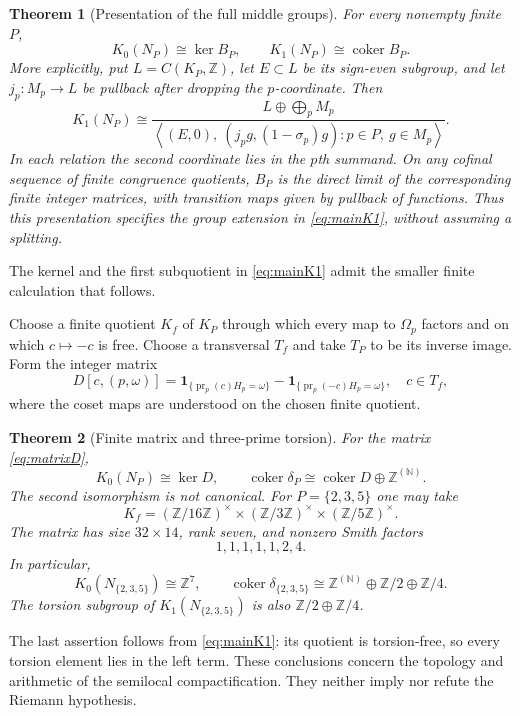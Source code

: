 \documentclass[11pt]{article}
\newcommand{\Z}{\mathbb Z}
\newcommand{\N}{\mathbb N}
\newcommand{\coker}{\operatorname{coker}}
\newcommand{\one}{\mathbf 1}
\newtheorem{theorem}{Theorem}[section]
\theoremstyle{definition}
\theoremstyle{remark}
\begin{document}
\begin{theorem}[Presentation of the full middle groups]\label{thm:presentation}
For every nonempty finite $P$,
\[
 K_0(N_P)\cong\ker B_P,\qquad K_1(N_P)\cong\coker B_P.
\]
More explicitly, put $L=C(K_P,\Z)$, let $E\subset L$ be its sign-even subgroup, and let $j_p:M_p\to L$ be pullback after dropping the $p$-coordinate. Then
\begin{equation}\label{eq:K1presentation}
 K_1(N_P)\cong
 \frac{L\oplus\bigoplus_pM_p}
 {\left\langle(E,0),\ (j_pg,(1-\sigma_p)g):p\in P,\ g\in M_p\right\rangle}.
\end{equation}
In each relation the second coordinate lies in the $p$th summand. On any cofinal sequence of finite congruence quotients, $B_P$ is the direct limit of the corresponding finite integer matrices, with transition maps given by pullback of functions. Thus this presentation specifies the group extension in \eqref{eq:mainK1}, without assuming a splitting.
\end{theorem}

The kernel and the first subquotient in \eqref{eq:mainK1} admit the smaller finite calculation that follows.

Choose a finite quotient $K_f$ of $K_P$ through which every map to $\Omega_p$ factors and on which $c\mapsto-c$ is free. Choose a transversal $T_f$ and take $T_P$ to be its inverse image. Form the integer matrix
\begin{equation}\label{eq:matrixD}
 D[c,(p,\omega)]=
 \one_{\{\operatorname{pr}_p(c)H_p=\omega\}}
 -\one_{\{\operatorname{pr}_p(-c)H_p=\omega\}},
 \quad c\in T_f,
\end{equation}
where the coset maps are understood on the chosen finite quotient.

\begin{theorem}[Finite matrix and three-prime torsion]\label{thm:finite}
For the matrix \eqref{eq:matrixD},
\[
 K_0(N_P)\cong\ker D,
 \qquad
 \coker\delta_P\cong\coker D\oplus\Z^{(\N)}.
\]
The second isomorphism is not canonical. For $P=\{2,3,5\}$ one may take
\[
 K_f=(\Z/16\Z)^\times\times(\Z/3\Z)^\times
                  \times(\Z/5\Z)^\times.
\]
The matrix has size $32\times14$, rank seven, and nonzero Smith factors
\[
 1,1,1,1,1,2,4.
\]
In particular,
\[
 K_0(N_{\{2,3,5\}})\cong\Z^7,
 \qquad
 \coker\delta_{\{2,3,5\}}
 \cong\Z^{(\N)}\oplus\Z/2\oplus\Z/4.
\]
The torsion subgroup of $K_1(N_{\{2,3,5\}})$ is also $\Z/2\oplus\Z/4$.
\end{theorem}

The last assertion follows from \eqref{eq:mainK1}: its quotient is torsion-free, so every torsion element lies in the left term. These conclusions concern the topology and arithmetic of the semilocal compactification. They neither imply nor refute the Riemann hypothesis.
\end{document}
